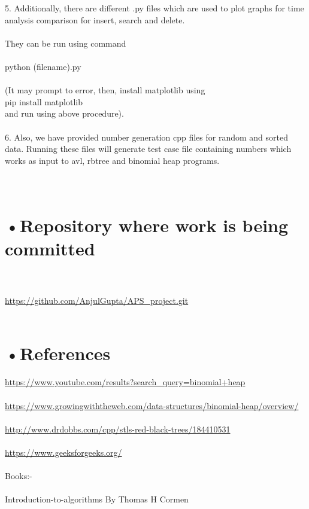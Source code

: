 \documentclass[10pt,a4paper]{article} ,
\begin{document}
5. Additionally, there are different .py files which are used to plot graphs for time analysis comparison for insert, search and delete.\\ \\
They can be run using command \\ \\
python (filename).py \\ \\

(It may prompt to error, then, install matplotlib using \\
pip install matplotlib \\
and run using above procedure). \\ \\

6. Also, we have provided number generation cpp files for random and sorted data. Running these files will generate test case file containing numbers which works as input to avl, rbtree and binomial heap programs. \\ \\ \\
		
		
		\section*{•Repository where work is being committed} \\ \\
		\url{https://github.com/AnjulGupta/APS\_project.git} \\ \\
		
		\section*{•References}
		\url{https://www.youtube.com/results?search_query=binomial+heap} \\ \\
     \url{https://www.growingwiththeweb.com/data-structures/binomial-heap/overview/} \\ \\
	\url{http://www.drdobbs.com/cpp/stls-red-black-trees/184410531} \\ \\
	\url{https://www.geeksforgeeks.org/} \\ \\
 
Books:- \\ \\
	Introduction-to-algorithms By Thomas H Cormen

	
	
\end{document}
